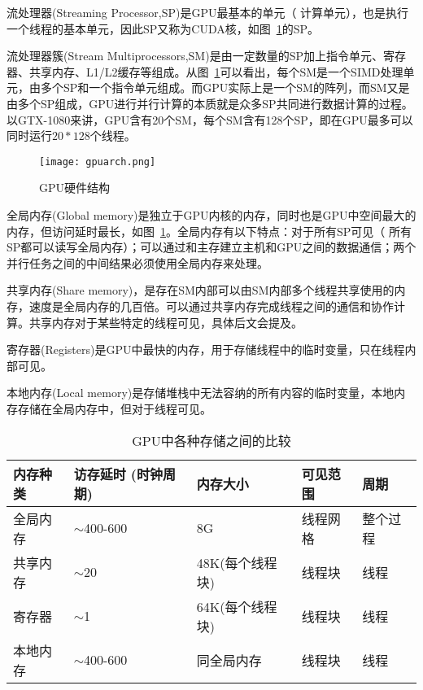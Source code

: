 流处理器(Streaming Processor,SP)是GPU最基本的单元（ 计算单元），也是执行一个线程的基本单元，因此SP又称为CUDA核，如图~\ref{fig:GPU-HW-Arch}的SP。

流处理器簇(Stream Multiprocessors,SM)是由一定数量的SP加上指令单元、寄存器、共享内存、L1/L2缓存等组成。从图~\ref{fig:GPU-HW-Arch}可以看出，每个SM是一个SIMD处理单元，由多个SP和一个指令单元组成。而GPU实际上是一个SM的阵列，而SM又是由多个SP组成，GPU进行并行计算的本质就是众多SP共同进行数据计算的过程。以GTX-1080来讲，GPU含有20个SM，每个SM含有128个SP，即在GPU最多可以同时运行$20*128$个线程。
\begin{figure}[H] %
	\centering
	\texttt{[image: gpuarch.png]}
	\caption{GPU硬件结构}
	\label{fig:GPU-HW-Arch}
\end{figure}

全局内存(Global  memory)是独立于GPU内核的内存，同时也是GPU中空间最大的内存，但访问延时最长，如图~\ref{fig:GPU-HW-Arch}。全局内存有以下特点：对于所有SP可见（ 所有SP都可以读写全局内存）；可以通过和主存建立主机和GPU之间的数据通信；两个并行任务之间的中间结果必须使用全局内存来处理。

共享内存(Share memory)，是存在SM内部可以由SM内部多个线程共享使用的内存，速度是全局内存的几百倍。可以通过共享内存完成线程之间的通信和协作计算。共享内存对于某些特定的线程可见，具体后文会提及。

寄存器(Registers)是GPU中最快的内存，用于存储线程中的临时变量，只在线程内部可见。

本地内存(Local memory)是存储堆栈中无法容纳的所有内容的临时变量，本地内存存储在全局内存中，但对于线程可见。
\begin{table}[htbp]
	\centering
	\begin{minipage}{0.9\textwidth}
		\caption{GPU中各种存储之间的比较}
		\label{tab:memory}
		\begin{tabular}{p{2cm}p{2.1cm}p{3cm}p{2cm}p{2cm}}
			\toprule[1.5pt]
			{\heiti 内存种类} & {\heiti 访存延时} (时钟周期)&{\heiti 内存大小} &{\heiti 可见范围} &{\heiti 周期}\\\midrule[1pt]
			全局内存 & $\sim$400-600 & 8G & 线程网格 & 整个过程 \\
			共享内存 & $\sim$20 & 48K(每个线程块) & 线程块 & 线程 \\
			寄存器 & $\sim$1 & 64K(每个线程块) & 线程块 & 线程 \\
			本地内存 & $\sim$400-600 & 同全局内存 & 线程块 & 线程 \\
			\bottomrule[1.5pt]
		\end{tabular}
	\end{minipage}
\end{table}

